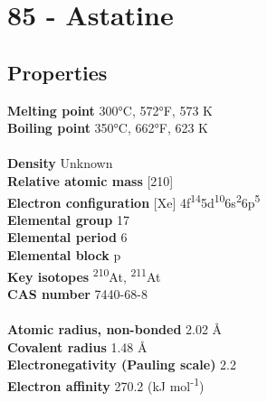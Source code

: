 \section{85 - Astatine}
\label{sec:elem-astatine}
\subsection{Properties}
\textbf{Melting point} 300°C, 572°F, 573 K\\
\textbf{Boiling point} 350°C, 662°F, 623 K\\
\\
\textbf{Density} Unknown\\
\textbf{Relative atomic mass} [210]\\
\textbf{Electron configuration} [Xe] 4f\textsuperscript{14}5d\textsuperscript{10}6s\textsuperscript{2}6p\textsuperscript{5}\\
\textbf{Elemental group} 17\\
\textbf{Elemental period} 6\\
\textbf{Elemental block} p\\
\textbf{Key isotopes} \textsuperscript{210}At, \textsuperscript{211}At\\
\textbf{CAS number} 7440-68-8\\
\\
\textbf{Atomic radius, non-bonded} 2.02 Å\\
\textbf{Covalent radius} 1.48 Å\\
\textbf{Electronegativity (Pauling scale)} 2.2\\
\textbf{Electron affinity} 270.2 (kJ mol\textsuperscript{-1})\\